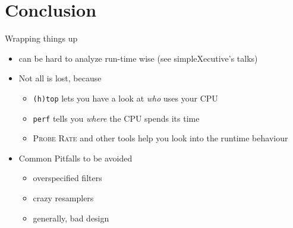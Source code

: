 \section{Conclusion}

\begin{frame}{Wrapping things up}
  \begin{itemize}
  \item \GR can be hard to analyze run-time wise (see simpleXecutive's talks)
  \item Not all is lost, because
    \begin{itemize}
    \item \texttt{(h)top} lets you have a look at \textit{who} uses your CPU
    \item \texttt{perf} tells you \textit{where} the CPU spends its time
      \item \textsc{Probe Rate} and other \GR tools help you look into the
        runtime behaviour
      \end{itemize}
    \item Common Pitfalls to be avoided
      \begin{itemize}
      \item overspecified filters
      \item crazy resamplers
        \item generally, bad design
      \end{itemize}
  \end{itemize}
\end{frame}
